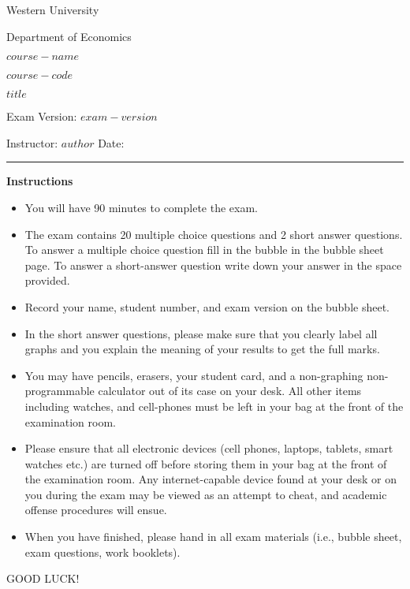 \begin{titlepage}
    \centering
    {\LARGE Western University\par}
    {\Large Department of Economics\par}
    \vspace{1cm}
    {\large $course-name$ \par
    $course-code$ \par
    $title$ \par
    Exam Version: $exam-version$ \par}
    \vspace{1cm}
    Instructor: $author$ \hfill Date:\enspace\rule{4cm}{0.4pt}\par
    \vspace{1cm}
    \raggedleft
    \vfill
    {\centering 
        {\bf Instructions \par}
    }
    \raggedleft
    \begin{itemize}
        \item You will have 90 minutes to complete the exam.
        \item The exam contains 20 multiple choice questions and 2 short answer questions. To answer a multiple choice question fill in the bubble in the bubble sheet page. To answer a short-answer question write down your answer in the space provided.
        \item Record your name, student number, and exam version on the bubble sheet.
        \item In the short answer questions, please make sure that you clearly label all graphs and you explain the meaning of your results to get the full marks.
        \item You may have pencils, erasers, your student card, and a non-graphing non-programmable calculator out of its case on your desk. All other items including watches, and cell-phones must be left in your bag at the front of the examination room.
        \item Please ensure that all electronic devices (cell phones, laptops, tablets, smart watches etc.) are turned off before storing them in your bag at the front of the examination room.  Any internet-capable device found at your desk or on you during the exam may be viewed as an attempt to cheat, and academic offense procedures will ensue.
        \item When you have finished, please hand in all exam materials (i.e., bubble sheet, exam questions, work booklets).
    \end{itemize}
    \centering GOOD LUCK!
\end{titlepage}
\newpage

